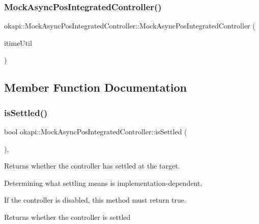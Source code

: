 \subsubsection{\texorpdfstring{MockAsyncPosIntegratedController()}{MockAsyncPosIntegratedController()}\hspace{0.1cm}{\footnotesize\ttfamily [2/2]}}
{\footnotesize\ttfamily okapi\+::\+Mock\+Async\+Pos\+Integrated\+Controller\+::\+Mock\+Async\+Pos\+Integrated\+Controller (\begin{DoxyParamCaption}\item[{const \mbox{\hyperlink{classokapi_1_1TimeUtil}{Time\+Util}} \&}]{itime\+Util }\end{DoxyParamCaption})\hspace{0.3cm}{\ttfamily [explicit]}}



\subsection{Member Function Documentation}
\mbox{\label{classokapi_1_1MockAsyncPosIntegratedController_ac97459be83cf9ddb555092bc5e99a279}} 
\subsubsection{\texorpdfstring{isSettled()}{isSettled()}}
{\footnotesize\ttfamily bool okapi\+::\+Mock\+Async\+Pos\+Integrated\+Controller\+::is\+Settled (\begin{DoxyParamCaption}{ }\end{DoxyParamCaption})\hspace{0.3cm}{\ttfamily [override]}, {\ttfamily [virtual]}}



Returns whether the controller has settled at the target. 

Determining what settling means is implementation-\/dependent.

If the controller is disabled, this method must return true.

\begin{DoxyReturn}{Returns}
whether the controller is settled 
\end{DoxyReturn}


